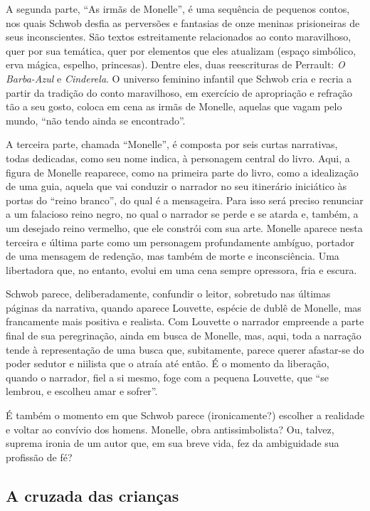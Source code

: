 A segunda parte, ``As irmãs de Monelle'', é uma sequência de pequenos
contos, nos quais Schwob desfia as perversões e fantasias de onze meninas
prisioneiras de seus inconscientes. São textos estreitamente relacionados ao
conto maravilhoso, quer por sua temática, quer por elementos que eles atualizam
(espaço simbólico, erva mágica, espelho, princesas). Dentre eles, duas
reescrituras de Perrault: \textit{O Barba-Azul} e \textit{Cinderela}. O
universo feminino infantil que Schwob cria e recria a partir da tradição do
conto maravilhoso, em exercício de apropriação e refração tão a seu gosto,
coloca em cena as irmãs de Monelle, aquelas que vagam pelo mundo, “não tendo
ainda se encontrado”. 

A terceira parte, chamada ``Monelle'', é composta por seis curtas
narrativas, todas dedicadas, como seu nome indica, à personagem central do
livro. Aqui, a figura de Monelle reaparece, como na
primeira parte do livro, como a idealização de uma guia, aquela que vai conduzir
o narrador no seu itinerário iniciático às portas do “reino branco”, do qual é
a mensageira. Para isso será preciso renunciar a um falacioso reino negro, no
qual o narrador se perde e se atarda e, também, a um desejado reino vermelho,
que ele constrói com sua arte. Monelle aparece nesta terceira e última parte
como um personagem profundamente ambíguo, portador de uma mensagem de redenção,
mas também de morte e inconsciência. Uma libertadora que, no entanto, evolui em
uma cena sempre opressora, fria e escura.

Schwob parece, deliberadamente, confundir o leitor, sobretudo nas últimas
páginas da narrativa, quando aparece Louvette, espécie de dublê de Monelle, mas
francamente mais positiva e realista. Com Louvette o narrador empreende a parte
final de sua peregrinação, ainda em busca de Monelle, mas, aqui, toda a
narração tende à representação de uma busca que, subitamente, parece querer
afastar-se do poder sedutor e niilista que o atraía até então. É o momento da
liberação, quando o narrador, fiel a si mesmo, foge com a pequena Louvette, que
“se lembrou, e escolheu amar e sofrer”.

É também o momento em que Schwob parece (ironicamente?) escolher a realidade
e voltar ao convívio dos homens. Monelle, obra antissimbolista? Ou, talvez,
suprema ironia de um autor que, em sua breve vida, fez da ambiguidade sua
profissão de fé?

\subsection{A cruzada das crianças}

